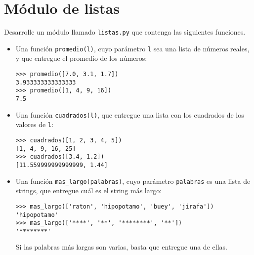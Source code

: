 \section{Módulo de listas}

Desarrolle un módulo llamado \lstinline!listas.py! que contenga las
siguientes funciones.

\begin{itemize}
\item
  Una función \lstinline!promedio(l)!, cuyo parámetro \lstinline!l! sea
  una lista de números reales, y que entregue el promedio de los
  números:

\begin{lstlisting}
>>> promedio([7.0, 3.1, 1.7])
3.933333333333333
>>> promedio([1, 4, 9, 16])
7.5
\end{lstlisting}
\item
  Una función \lstinline!cuadrados(l)!, que entregue una lista con los
  cuadrados de los valores de \lstinline!l!:

\begin{lstlisting}
>>> cuadrados([1, 2, 3, 4, 5])
[1, 4, 9, 16, 25]
>>> cuadrados([3.4, 1.2])
[11.559999999999999, 1.44]
\end{lstlisting}
\item
  Una función \lstinline!mas_largo(palabras)!, cuyo parámetro
  \lstinline!palabras! es una lista de strings, que entregue cuál es el
  string más largo:

\begin{lstlisting}
>>> mas_largo(['raton', 'hipopotamo', 'buey', 'jirafa'])
'hipopotamo'
>>> mas_largo(['****', '**', '********', '**'])
'********'
\end{lstlisting}

  Si las palabras más largas son varias, basta que entregue una de
  ellas.
\end{itemize}

